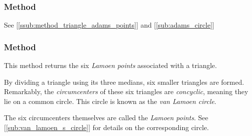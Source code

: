 \subsubsection{Method }
\label{ssub:method_triangle_adams_circle}
See  [\ref{ssub:method_triangle_adams_points}] and [\ref{sub:adams_circle}]

\begin{minipage}{.5\textwidth}
\end{minipage}
\begin{minipage}{.5\textwidth}
\begin{tkzexample}
\end{tkzexample}
\end{minipage}

\subsubsection{Method }
\label{ssub:method_triangle_lamoen_points}

This method returns the six \emph{Lamoen points} associated with a triangle.

By dividing a triangle using its three medians, six smaller triangles are formed. Remarkably, the \emph{circumcenters} of these six triangles are \emph{concyclic}, meaning they lie on a common circle. This circle is known as the \emph{van Lamoen circle}.

The six circumcenters themselves are called the \emph{Lamoen points}. See  [\ref{sub:van_lamoen_s_circle}] for details on the corresponding circle.

\vspace{1em}

